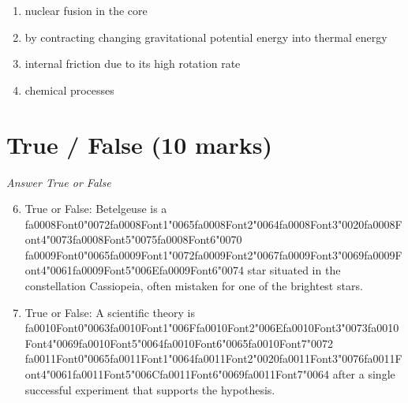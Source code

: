 \documentclass[12pt]{article}
\begin{document}
\begin{enumerate}[label=\arabic*.]
\begin{enumerate}[label=(\alph*)]
    \item nuclear fusion in the core
    \item by contracting changing gravitational potential energy into thermal energy
    \item internal friction due to its high rotation rate
    \item chemical processes
\end{enumerate}
\end{enumerate}

\section*{True / False (10 marks)}
\textit{Answer True or False}
\begin{enumerate}[label=\arabic*.]
\setcounter{enumi}{5}
\item True or False: Betelgeuse is a {\csname fa0008Font0\endcsname\char"0072}{\csname fa0008Font1\endcsname\char"0065}{\csname fa0008Font2\endcsname\char"0064}{\csname fa0008Font3\endcsname\char"0020}{\csname fa0008Font4\endcsname\char"0073}{\csname fa0008Font5\endcsname\char"0075}{\csname fa0008Font6\endcsname\char"0070} {\csname fa0009Font0\endcsname\char"0065}{\csname fa0009Font1\endcsname\char"0072}{\csname fa0009Font2\endcsname\char"0067}{\csname fa0009Font3\endcsname\char"0069}{\csname fa0009Font4\endcsname\char"0061}{\csname fa0009Font5\endcsname\char"006E}{\csname fa0009Font6\endcsname\char"0074} star situated in the constellation Cassiopeia, often mistaken for one of the brightest stars.
\item True or False: A scientific theory is {\csname fa0010Font0\endcsname\char"0063}{\csname fa0010Font1\endcsname\char"006F}{\csname fa0010Font2\endcsname\char"006E}{\csname fa0010Font3\endcsname\char"0073}{\csname fa0010Font4\endcsname\char"0069}{\csname fa0010Font5\endcsname\char"0064}{\csname fa0010Font6\endcsname\char"0065}{\csname fa0010Font7\endcsname\char"0072} {\csname fa0011Font0\endcsname\char"0065}{\csname fa0011Font1\endcsname\char"0064}{\csname fa0011Font2\endcsname\char"0020}{\csname fa0011Font3\endcsname\char"0076}{\csname fa0011Font4\endcsname\char"0061}{\csname fa0011Font5\endcsname\char"006C}{\csname fa0011Font6\endcsname\char"0069}{\csname fa0011Font7\endcsname\char"0064} after a single successful experiment that supports the hypothesis.

\end{enumerate}
\end{document}
